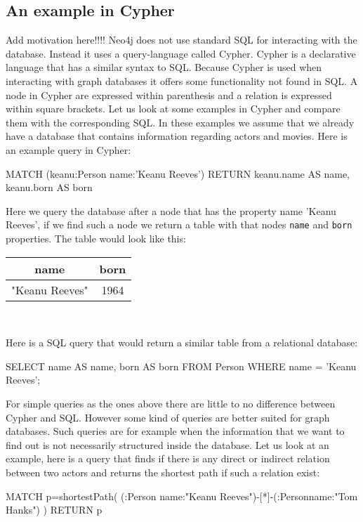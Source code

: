 \subsection{An example in Cypher}
Add motivation here!!!!
Neo4j does not use standard SQL for interacting with the database. Instead it uses a query-language called Cypher. Cypher is a declarative language that has a similar syntax to SQL. Because Cypher is used when interacting with graph databases it offers some functionality not found in SQL. A node in Cypher are expressed within parenthesis and a relation is expressed within square brackets. Let us look at some examples in Cypher and compare them with the corresponding SQL. In these examples we assume that we already have a database that contains information regarding actors and movies. Here is an example query in Cypher:
\begin{sqlCode}
  MATCH (keanu:Person {name:'Keanu Reeves'})
  RETURN keanu.name AS name, keanu.born AS born
\end{sqlCode}
Here we query the database after a node that has the property name 'Keanu Reeves', if we find such a node we return a table with that nodes \texttt{name} and \texttt{born} properties. The table would look like this:
\begin{center}
  \begin{tabular}{|c|c|}
    \hline
    name           & born \\
    \hline
    "Keanu Reeves" & 1964 \\
    \hline
  \end{tabular}\\
\end{center}
Here is a SQL query that would return a similar table from a relational database:


\begin{sqlCode}
SELECT
  name AS name,
  born AS born
FROM
  Person
WHERE
  name = 'Keanu Reeves';
\end{sqlCode}

For simple queries as the ones above there are little to no difference between Cypher and SQL. However some kind of queries are better suited for graph databases. Such queries are for example when the information that we want to find out is not necessarily structured inside the database. Let us look at an example, here is a query that finds if there is any direct or indirect relation between two actors and returns the shortest path if such a relation exist:

\begin{sqlCode}
MATCH p=shortestPath(
(:Person {name:"Keanu Reeves"})-[*]-(:Person{name:"Tom Hanks"})
) RETURN p
\end{sqlCode}

